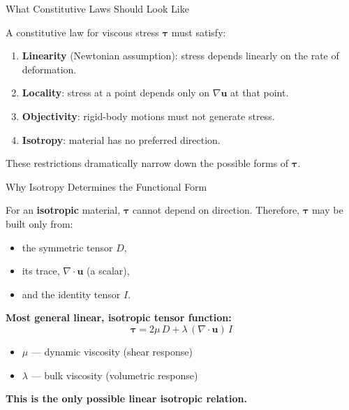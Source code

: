\documentclass[aspectratio=169]{beamer}
\begin{document}
\begin{frame}{What Constitutive Laws Should Look Like}

A constitutive law for viscous stress $\boldsymbol{\tau}$ must satisfy:

\begin{enumerate}
\item \textbf{Linearity} (Newtonian assumption):  
      stress depends linearly on the rate of deformation.
\item \textbf{Locality}: stress at a point depends only on $\nabla \mathbf{u}$ at that point.
\item \textbf{Objectivity}: rigid-body motions must not generate stress.
\item \textbf{Isotropy}: material has no preferred direction.
\end{enumerate}

\medskip

These restrictions dramatically narrow down the possible forms of $\boldsymbol{\tau}$.

\end{frame}

\begin{frame}{Why Isotropy Determines the Functional Form}

For an \textbf{isotropic} material, $\boldsymbol{\tau}$ cannot depend on direction.
Therefore, $\boldsymbol{\tau}$ may be built only from:

\begin{itemize}
\item the symmetric tensor $D$,
\item its trace, $\nabla\!\cdot\mathbf{u}$ (a scalar),
\item and the identity tensor $I$.
\end{itemize}

\medskip

\textbf{Most general linear, isotropic tensor function:}
\[
\boxed{
\boldsymbol{\tau}
=
2\mu\, D
+
\lambda\,(\nabla\!\cdot\mathbf{u})\,I
}
\]

\begin{itemize}
\item $\mu$ — dynamic viscosity (shear response)
\item $\lambda$ — bulk viscosity (volumetric response)
\end{itemize}

\textbf{This is the only possible linear isotropic relation.}

\end{frame}
\end{document}
